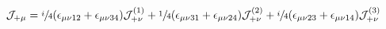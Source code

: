 \begin{equation}
 \mathcal{J}_{+\mu}=\sfrac{i}{4}(\epsilon_{\mu\nu12}+
         \epsilon_{\mu\nu34})\mathcal{J}_{+\nu}^{(1)}
                + \sfrac{1}{4}(\epsilon_{\mu\nu31}+
         \epsilon_{\mu\nu24})\mathcal{J}_{+\nu}^{(2)}
                + \sfrac{i}{4}(\epsilon_{\mu\nu23}+
         \epsilon_{\mu\nu14})\mathcal{J}_{+\nu}^{(3)}
\end{equation}

